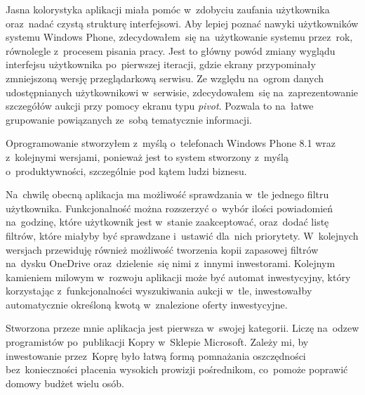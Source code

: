 \documentclass[a4paper,twoside,titlepage,openright]{book}
\begin{document}
Jasna kolorystyka aplikacji miała pomóc w~zdobyciu zaufania użytkownika oraz~nadać czystą strukturę interfejsowi. Aby lepiej poznać nawyki użytkowników systemu Windows Phone, zdecydowałem~się na~użytkowanie systemu przez~rok, równolegle z~procesem pisania pracy. Jest to główny powód zmiany wyglądu interfejsu użytkownika po~pierwszej iteracji, gdzie ekrany przypominały zmniejszoną wersję przeglądarkową serwisu. Ze względu na~ogrom danych udostępnianych użytkownikowi w~serwisie, zdecydowałem~się na~zaprezentowanie szczegółów aukcji przy pomocy ekranu typu \textit{pivot}. Pozwala to na~łatwe grupowanie powiązanych ze~sobą tematycznie informacji. 

Oprogramowanie stworzyłem z~myślą o~telefonach Windows Phone 8.1 wraz z~kolejnymi wersjami, ponieważ jest to system stworzony z~myślą o~produktywności, szczególnie pod kątem ludzi biznesu.

Na~chwilę obecną aplikacja ma możliwość sprawdzania w~tle jednego filtru użytkownika. Funkcjonalność można rozszerzyć o~wybór ilości powiadomień na~godzinę, które użytkownik jest w~stanie zaakceptować, oraz~dodać listę filtrów, które miałyby być sprawdzane i~ustawić dla~nich priorytety. W~kolejnych wersjach przewiduję również możliwość tworzenia kopii zapasowej filtrów na~dysku OneDrive oraz~dzielenie~się nimi z~innymi inwestorami. Kolejnym kamieniem milowym w~rozwoju aplikacji może być automat inwestycyjny, który korzystając z~funkcjonalności wyszukiwania aukcji w~tle, inwestowałby automatycznie określoną kwotą w~znalezione oferty inwestycyjne.

Stworzona przeze mnie aplikacja jest pierwsza w~swojej kategorii. Liczę na~odzew programistów po~publikacji Kopry w~Sklepie Microsoft. Zależy mi, by inwestowanie przez~Koprę było łatwą formą pomnażania oszczędności bez~konieczności płacenia wysokich prowizji pośrednikom, co~pomoże poprawić domowy budżet wielu osób.
 
 
 
 
\listoffigures
\end{document}
